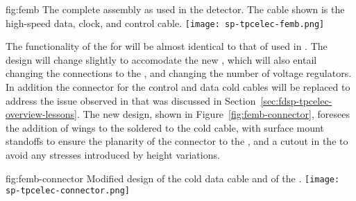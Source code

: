 \begin{dunefigure}
{fig:femb}
{The complete  assembly as used in the  
detector. The cable shown is the high-speed data, clock, and control cable.}
\texttt{[image: sp-tpcelec-femb.png]}
\end{dunefigure}

The functionality of the  for  will be
almost identical to that of  used in .
The design will change slightly to accomodate the new ,
which will also entail changing the connections to the ,
and changing the number of voltage regulators. In addition the
connector for the control and data cold cables will be replaced
to address the issue observed in  that was discussed
in Section~\ref{sec:fdsp-tpcelec-overview-lessons}. The new design,
shown in Figure~\ref{fig:femb-connector}, foresees the addition
of wings to the  soldered to the cold cable, with 
surface mount standoffs to ensure the planarity of the connector
to the , and a cutout in the  to avoid
any stresses introduced by height variations.

\begin{dunefigure}
{fig:femb-connector}
{Modified design of the cold data cable and of the  .}
\texttt{[image: sp-tpcelec-connector.png]}
\end{dunefigure}

